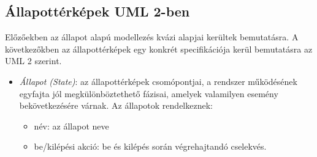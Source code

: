 \subsection{Állapottérképek UML 2-ben}
Előzőekben az állapot alapú modellezés kvázi alapjai kerültek bemutatásra. A következőkben az állapottérképek egy konkrét specifikációja kerül bemutatásra az UML 2 szerint.

\begin{itemize}
	\item \emph{Állapot (State)}: az állapottérképek csomópontjai, a rendszer működésének egyfajta jól megkülönböztethető fázisai, amelyek valamilyen esemény bekövetkezésére várnak. Az állapotok rendelkeznek:
	\begin{itemize}
		\item név: az állapot neve
		\item be/kilépési akció: be és kilépés során végrehajtandó cselekvés.
	\end{itemize}
	

\end{itemize}
